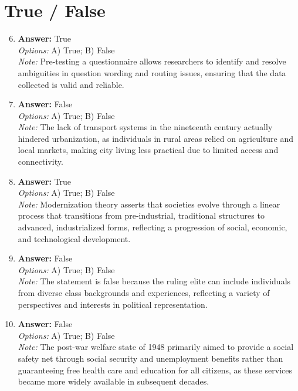 \documentclass[12pt]{article}
\begin{document}
\section*{True / False}
\begin{enumerate}[label=\arabic*.]
\setcounter{enumi}{5}
\item \textbf{Answer:} True
\\ \textit{Options:} A) True; B) False
\\ \textit{Note:} Pre-testing a questionnaire allows researchers to identify and resolve ambiguities in question wording and routing issues, ensuring that the data collected is valid and reliable.
\item \textbf{Answer:} False
\\ \textit{Options:} A) True; B) False
\\ \textit{Note:} The lack of transport systems in the nineteenth century actually hindered urbanization, as individuals in rural areas relied on agriculture and local markets, making city living less practical due to limited access and connectivity.
\item \textbf{Answer:} True
\\ \textit{Options:} A) True; B) False
\\ \textit{Note:} Modernization theory asserts that societies evolve through a linear process that transitions from pre-industrial, traditional structures to advanced, industrialized forms, reflecting a progression of social, economic, and technological development.
\item \textbf{Answer:} False
\\ \textit{Options:} A) True; B) False
\\ \textit{Note:} The statement is false because the ruling elite can include individuals from diverse class backgrounds and experiences, reflecting a variety of perspectives and interests in political representation.
\item \textbf{Answer:} False
\\ \textit{Options:} A) True; B) False
\\ \textit{Note:} The post-war welfare state of 1948 primarily aimed to provide a social safety net through social security and unemployment benefits rather than guaranteeing free health care and education for all citizens, as these services became more widely available in subsequent decades.
\end{enumerate}
\end{document}
